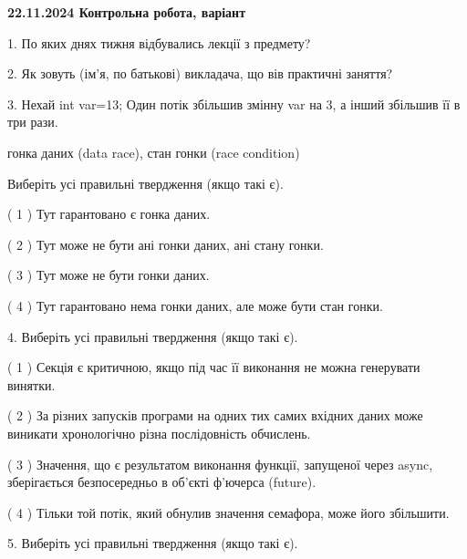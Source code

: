 \documentclass[12pt, ukrainian]{article}
\begin{document}
\vspace{4mm}
\newpage
\begin {large}

\textbf{22.11.2024 Контрольна робота, варіант  }\par


{
1. По яких днях тижня відбувались лекції з предмету?



\vspace{5mm}
2. Як зовуть (ім'я, по батькові) викладача, що вів практичні заняття?



\vspace{5mm}
3. Нехай int var=13; Один потік збільшив змінну var на 3, а інший збільшив її в три рази.

гонка даних (data race), стан гонки (race condition)

Виберіть усі правильні твердження (якщо такі є).\par
\vspace{2mm}
( 1 ) Тут гарантовано є гонка даних.%

( 2 ) Тут може не бути ані гонки даних, ані стану гонки.%

( 3 ) Тут може не бути гонки даних.%

( 4 ) Тут гарантовано нема гонки даних, але може бути стан гонки.%


\vspace{5mm}
4. Виберіть усі правильні твердження (якщо такі є).\par
\vspace{2mm}

( 1 ) Секція є критичною, якщо під час її виконання не можна генерувати винятки.%

( 2 ) За різних запусків програми на одних тих самих вхідних даних може виникати хронологічно різна послідовність обчислень.%

( 3 ) Значення, що є результатом виконання функції, запущеної через async, зберігається безпосередньо в об’єкті ф’ючерса (future).%

( 4 ) Тільки той потік, який обнулив значення семафора, може його збільшити.%


\vspace{5mm}
5. Виберіть усі правильні твердження (якщо такі є).\par
\vspace{2mm}

}
\end{large}
\end{document}
